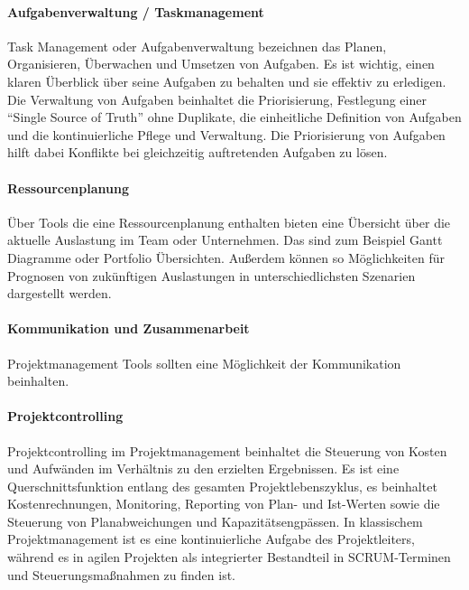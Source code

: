 \documentclass[sigconf, nonacm]{acmart}
\begin{document}
\paragraph{Aufgabenverwaltung / Taskmanagement}
Task Management oder Aufgabenverwaltung bezeichnen das Planen, Organisieren, Überwachen und Umsetzen von Aufgaben. Es ist wichtig, einen klaren Überblick über seine Aufgaben zu behalten und sie effektiv zu erledigen. 
Die Verwaltung von Aufgaben beinhaltet die Priorisierung, Festlegung einer \enquote{Single Source of Truth} ohne Duplikate, die einheitliche Definition von Aufgaben und die kontinuierliche Pflege und Verwaltung. 
Die Priorisierung von Aufgaben hilft dabei Konflikte bei gleichzeitig auftretenden Aufgaben zu lösen.~\cite{venzmer_task_2020}
\paragraph{Ressourcenplanung}
Über Tools die eine Ressourcenplanung enthalten bieten eine Übersicht über die aktuelle Auslastung im Team oder Unternehmen. Das sind zum Beispiel Gantt Diagramme oder Portfolio Übersichten. Außerdem können so Möglichkeiten für Prognosen von zukünftigen Auslastungen in unterschiedlichsten Szenarien dargestellt werden.~\cite{venzmer_wie_2020}
\paragraph{Kommunikation und Zusammenarbeit}
Projektmanagement Tools sollten eine Möglichkeit der Kommunikation beinhalten.
\paragraph{Projektcontrolling}
Projektcontrolling im Projektmanagement beinhaltet die Steuerung von Kosten und Aufwänden im Verhältnis zu den erzielten Ergebnissen. Es ist eine Querschnittsfunktion entlang des gesamten Projektlebenszyklus, es beinhaltet Kostenrechnungen, Monitoring, Reporting von Plan- und Ist-Werten sowie die Steuerung von Planabweichungen und Kapazitätsengpässen. In klassischem Projektmanagement ist es eine kontinuierliche Aufgabe des Projektleiters, während es in agilen Projekten als integrierter Bestandteil in SCRUM-Terminen und Steuerungsmaßnahmen zu finden ist.~\cite{venzmer_projektcontrolling-tool_2020}
\end{document}
